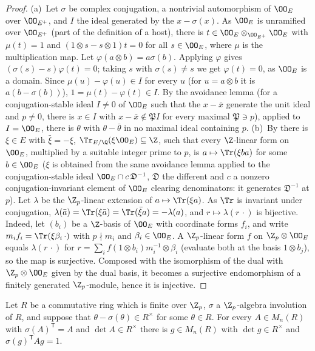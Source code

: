 \begin{proof}
(a)~Let $\sigma$ be complex conjugation, a nontrivial automorphism of $\OO_E$ over $\OO_{E^+}$, and $I$ the ideal generated
by the $x-\sigma(x)$. As $\OO_E$ is unramified over $\OO_{E^+}$ (part of the definition of a host), there is
$t\in\OO_E\otimes_{\OO_{E^+}}\OO_E$ with $\mu(t)=1$ and $(1\otimes s-s\otimes1)t=0$ for all $s\in\OO_E$, where $\mu$ is the
multiplication map. Let $\varphi(a\otimes b)=a\sigma(b)$. Applying $\varphi$ gives $(\sigma(s)-s)\varphi(t)=0$; taking $s$ with
$\sigma(s)\ne s$ we get $\varphi(t)=0$, as $\OO_E$ is a domain. Since $\mu(u)-\varphi(u)\in I$ for every $u$ (for $u=a\otimes b$
it is $a(b-\sigma(b))$), $1=\mu(t)-\varphi(t)\in I$. By the avoidance lemma
 (for a conjugation-stable ideal $I\ne0$ of $\OO_E$ such that the
$x-\bar x$ generate the unit ideal and $p\ne0$, there is $x\in I$ with $x-\bar x\notin\mathfrak PI$ for every maximal
$\mathfrak P\ni p$), applied to $I=\OO_E$, there is $\theta$ with $\theta-\bar\theta$ in no maximal ideal containing $p$.
(b)~By  there is $\xi\in E$ with $\bar\xi=-\xi$,
$\Tr_{E/\Q}(\xi\OO_E)\subseteq\Z$, such that every $\Z$-linear form on $\OO_E$, multiplied by a suitable integer prime to $p$,
is $a\mapsto\Tr(\xi ba)$ for some $b\in\OO_E$ ($\xi$ is obtained from the same avoidance lemma applied to the conjugation-stable
ideal $\OO_E\cap c\,\mathfrak D^{-1}$, $\mathfrak D$ the different and $c$ a nonzero conjugation-invariant element of $\OO_E$
clearing denominators: it generates $\mathfrak D^{-1}$ at $p$). Let $\lambda$ be the $\Z_p$-linear extension of
$a\mapsto\Tr(\xi a)$. As $\Tr$ is invariant under conjugation, $\lambda(\bar a)=\Tr(\xi\bar a)=\Tr(\bar\xi a)=-\lambda(a)$,
and $r\mapsto\lambda(r\,\cdot)$ is bijective. Indeed, let $(b_i)$ be a $\Z$-basis of $\OO_E$ with coordinate forms $f_i$, and
write $m_if_i=\Tr(\xi\beta_i\,\cdot)$ with $p\nmid m_i$ and $\beta_i\in\OO_E$. A $\Z_p$-linear form $f$ on $\Z_p\otimes\OO_E$
equals $\lambda(r\,\cdot)$ for $r=\sum_if(1\otimes b_i)m_i^{-1}\otimes\beta_i$ (evaluate both at the basis $1\otimes b_j$), so
the map is surjective. Composed with the isomorphism of the dual with $\Z_p\otimes\OO_E$ given by the dual basis, it becomes a
surjective endomorphism of a finitely generated $\Z_p$-module, hence it is injective.
\end{proof}

\begin{lemma}\label{pf:tower:semi}
Let $R$ be a commutative ring which is finite over $\Z_p$, $\sigma$ a $\Z_p$-algebra involution of $R$, and suppose that
$\theta-\sigma(\theta)\in R^\times$ for some $\theta\in R$. For every $A\in M_n(R)$ with $\sigma(A)^{\mathsf T}=A$ and
$\det A\in R^\times$ there is $g\in M_n(R)$ with $\det g\in R^\times$ and $\sigma(g)^{\mathsf T}Ag=1$.
\end{lemma}

